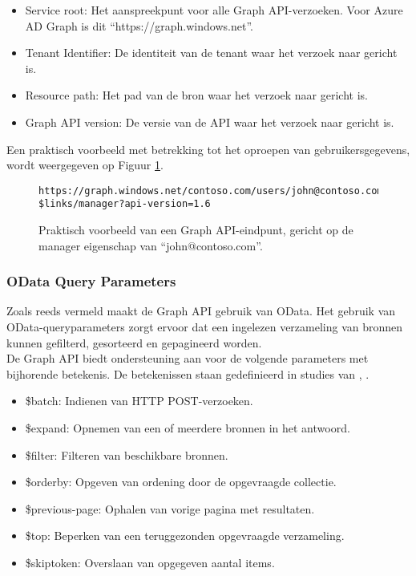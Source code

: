 \begin{itemize}
    \item Service root: Het aanspreekpunt voor alle Graph \ac{API}-verzoeken. Voor Azure \ac{AD} Graph is dit “https://graph.windows.net”.
    \item Tenant Identifier: De identiteit van de tenant waar het verzoek naar gericht is.
    \item Resource path: Het pad van de bron waar het verzoek naar gericht is.
    \item Graph \ac{API} version: De versie van de \ac{API} waar het verzoek naar gericht is.
\end{itemize}

Een praktisch voorbeeld met betrekking tot het oproepen van gebruikersgegevens, wordt weergegeven op Figuur \ref{pfe}. \\

\begin{figure}[h]
    \scriptsize\begin{verbatim}https://graph.windows.net/contoso.com/users/john@contoso.com/
$links/manager?api-version=1.6
    \end{verbatim}    
    \caption[Voorbeeld Graph API-eindpunt]{Praktisch voorbeeld van een Graph \ac{API}-eindpunt, gericht op de manager eigenschap van “john@contoso.com”.}
    \label{pfe}
\end{figure}



\subsubsection{OData Query Parameters}

Zoals reeds vermeld maakt de Graph \ac{API} gebruik van OData. Het gebruik van OData-queryparameters zorgt ervoor dat een ingelezen verzameling van bronnen kunnen gefilterd, gesorteerd en gepagineerd worden. \\

De Graph \ac{API} biedt ondersteuning aan voor de volgende parameters met bijhorende betekenis. De betekenissen staan gedefinieerd in studies van \textcite{Liang2016}, \textcite{Wojcieszyn2014}. 

\begin{itemize}
    \item \$batch: Indienen van \ac{HTTP} POST-verzoeken.
    \item \$expand: Opnemen van een of meerdere bronnen in het antwoord.
    \item \$filter: Filteren van beschikbare bronnen.
    \item \$orderby: Opgeven van ordening door de opgevraagde collectie.
    \item \$previous-page: Ophalen van vorige pagina met resultaten.
    \item \$top: Beperken van een teruggezonden opgevraagde verzameling.
    \item \$skiptoken: Overslaan van opgegeven aantal items.
\end{itemize}

